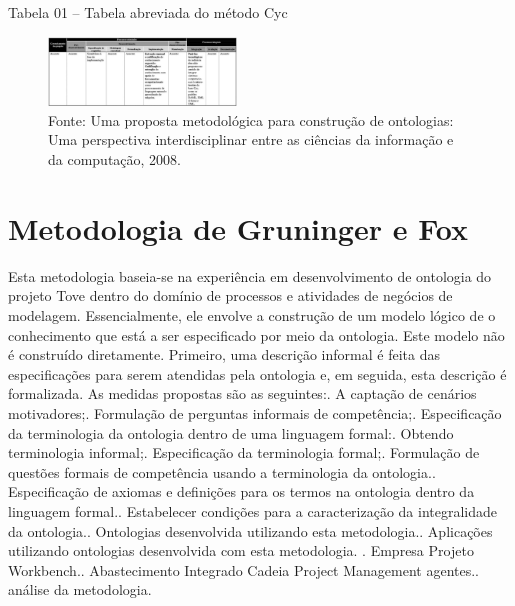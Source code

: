 \documentclass[a4paper]{report}
\begin{document}
Tabela 01 – Tabela abreviada do método Cyc
                                  
\begin{figure}[h] 
\centering %
\includegraphics[width=5cm]{Figuras/2.png} %
\caption{Fonte: Uma proposta metodológica para construção de ontologias: Uma perspectiva interdisciplinar entre as ciências da informação e da computação, 2008.}
\end{figure}

\section{Metodologia de Gruninger e Fox}    

\qquad Esta metodologia baseia-se na experiência em desenvolvimento de ontologia do projeto Tove dentro do domínio de processos e atividades de negócios de
modelagem. Essencialmente, ele envolve a construção de um modelo lógico de o conhecimento que está a ser especificado por meio da ontologia. Este modelo não é construído diretamente. Primeiro, uma descrição informal é feita das especificações para
serem atendidas pela ontologia e, em seguida, esta descrição é formalizada. As medidas propostas são as seguintes:. A captação de cenários motivadores;. Formulação de perguntas informais de competência;. Especificação da terminologia da ontologia dentro de uma linguagem formal:. Obtendo terminologia informal;. Especificação da terminologia formal;. Formulação de questões formais de competência usando a terminologia da ontologia.. Especificação de axiomas e definições para os termos na ontologia dentro da linguagem formal.. Estabelecer condições para a caracterização da integralidade da ontologia.. Ontologias desenvolvida utilizando esta metodologia.. Aplicações utilizando ontologias desenvolvida com esta metodologia. . Empresa Projeto Workbench.. Abastecimento Integrado Cadeia Project Management agentes.. análise da metodologia.\newline
\end{document}
